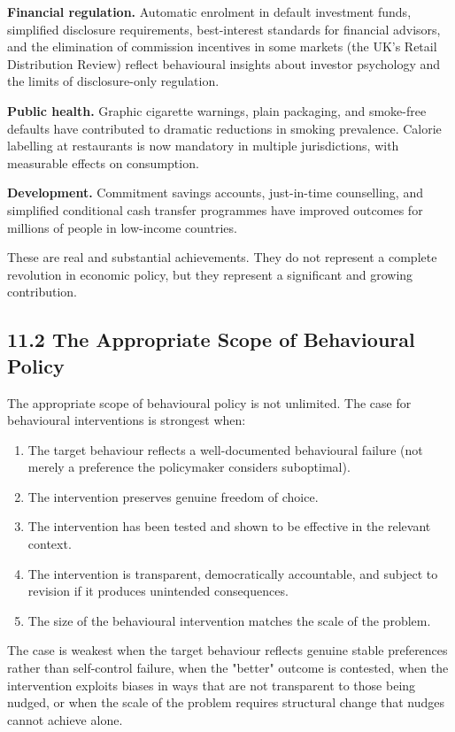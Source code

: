 \documentclass[12pt, letterpaper]{article}
\begin{document}
\textbf{Financial regulation.} Automatic enrolment in default investment funds, simplified disclosure requirements, best-interest standards for financial advisors, and the elimination of commission incentives in some markets (the UK's Retail Distribution Review) reflect behavioural insights about investor psychology and the limits of disclosure-only regulation.

\textbf{Public health.} Graphic cigarette warnings, plain packaging, and smoke-free defaults have contributed to dramatic reductions in smoking prevalence. Calorie labelling at restaurants is now mandatory in multiple jurisdictions, with measurable effects on consumption.

\textbf{Development.} Commitment savings accounts, just-in-time counselling, and simplified conditional cash transfer programmes have improved outcomes for millions of people in low-income countries.

These are real and substantial achievements. They do not represent a complete revolution in economic policy, but they represent a significant and growing contribution.


\subsection{11.2 The Appropriate Scope of Behavioural Policy}


The appropriate scope of behavioural policy is not unlimited. The case for behavioural interventions is strongest when:
\begin{enumerate}
\item The target behaviour reflects a well-documented behavioural failure (not merely a preference the policymaker considers suboptimal).
\item The intervention preserves genuine freedom of choice.
\item The intervention has been tested and shown to be effective in the relevant context.
\item The intervention is transparent, democratically accountable, and subject to revision if it produces unintended consequences.
\item The size of the behavioural intervention matches the scale of the problem.
\end{enumerate}

The case is weakest when the target behaviour reflects genuine stable preferences rather than self-control failure, when the "better" outcome is contested, when the intervention exploits biases in ways that are not transparent to those being nudged, or when the scale of the problem requires structural change that nudges cannot achieve alone.
\end{document}
